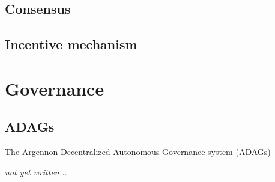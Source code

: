 \documentclass[11pt, a4paper]{report}
\newcommand{\note}[1] {
    \begin{tcolorbox}[colframe=white,colback=white]
        \emph{#1}
    \end{tcolorbox}
}
\begin{document}
    \section{Consensus}\label{sec:consensus}
    


    \section{Incentive mechanism}\label{sec:incentive-mechanism}
    




    \chapter{Governance}\label{ch:governance}
    \section{ADAGs}\label{sec:adags}
    The Argennon Decentralized Autonomous Governance system (ADAGs)
    \note{not yet written...}
\end{document}
